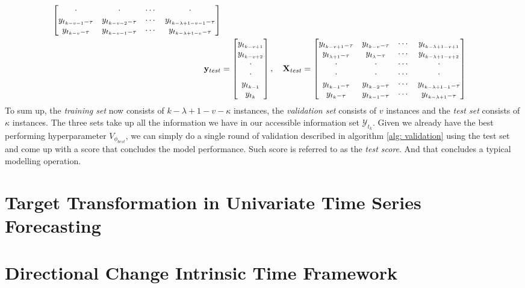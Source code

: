 \begin{align*}
\begin{bmatrix}
        \cdot                    & \cdot                    & \cdots & \cdot     \\
        y_{t_{k-v-1}-\tau}       & y_{t_{k-v-2} - \tau}       & \cdots & y_{t_{k-\lambda+1-v-1}-\tau} \\
        y_{t_{k-v}-\tau}         & y_{t_{k-v-1} - \tau}       & \cdots & y_{t_{k-\lambda+1-v}-\tau} 
    \end{bmatrix}\\
    \mathbf{y}_{test} &=
    \begin{bmatrix}
        y_{t_{k - v + 1}}       \\
        y_{t_{k - v + 2}} \\
        \cdot               \\
        \cdot               \\
        y_{t_{k - 1}}         \\
        y_{t_k}             
    \end{bmatrix}
    , \quad
    \mathbf{X}_{test} =
    \begin{bmatrix}
        y_{t_{k-v+1} - \tau}   & y_{t_{k-v} - \tau} & \cdots & y_{t_{k-\lambda+1-v+1}} \\
        y_{t_{\lambda+1} - \tau} & y_{t_{\lambda} - \tau}   & \cdots & y_{t_{k-\lambda+1-v+2}} \\
        \cdot                    & \cdot                    & \cdots & \cdot     \\
        \cdot                    & \cdot                    & \cdots & \cdot     \\
        y_{t_{k-1} - \tau}       & y_{t_{k-2} - \tau}       & \cdots & y_{t_{k-\lambda+1-1} - \tau} \\
        y_{t_{k} - \tau}         & y_{t_{k-1} - \tau}       & \cdots & y_{t_{k-\lambda+1} - \tau} 
    \end{bmatrix}
\end{align*}
To sum up, the \textit{training set} now consists of $k - \lambda + 1 - v - \kappa$ instances, the \textit{validation set} consists of $v$ instances and the \textit{test set} consists of $\kappa$ instances. The three sets take up all the information we have in our accessible information set $\mathcal{Y}_{t_k}$. Given we already have the best performing hyperparameter $V_{\phi_{best}}$, we can simply do a single round of validation described in algorithm \ref{alg: validation} using the test set and come up with a score that concludes the model performance. Such score is referred to as the \textit{test score}. And that concludes a typical modelling operation.

\section{Target Transformation in Univariate Time Series Forecasting}


\section{Directional Change Intrinsic Time Framework}
